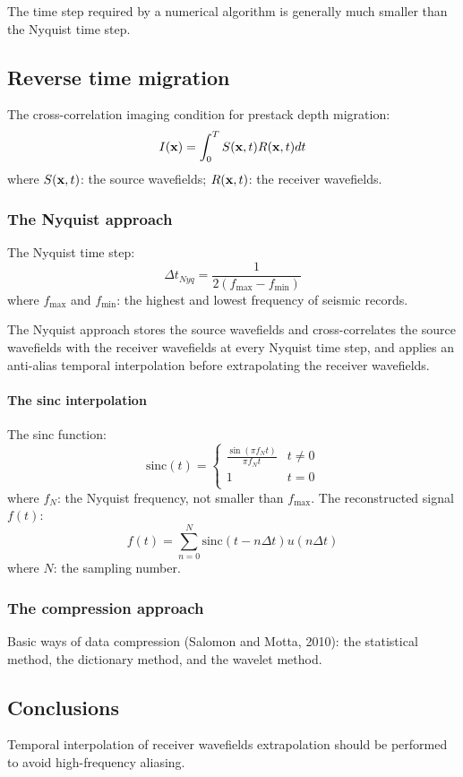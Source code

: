 The time step required by a numerical algorithm is generally much smaller
than the Nyquist time step.

\subsection{Reverse time migration}
The cross-correlation imaging condition for prestack depth migration:
\[ I(\mathbf{x}) = \int_0^T S(\mathbf{x}, t) R(\mathbf{x}, t) dt \]
where $S(\mathbf{x}, t)$: the source wavefields;
$R(\mathbf{x}, t)$: the receiver wavefields.

\subsubsection{The Nyquist approach}
The Nyquist time step:
\[ \Delta t_{Nyq} = \frac{1}{2 (f_\text{max} - f_\text{min})} \]
where $f_\text{max}$ and $f_\text{min}$: the highest and lowest frequency
of seismic records.

The Nyquist approach 
stores the source wavefields and cross-correlates the source wavefields
with the receiver wavefields at every Nyquist time step,
and applies an anti-alias temporal interpolation
before extrapolating the receiver wavefields.

\paragraph{The sinc interpolation}
The sinc function:
\[ \text{sinc}(t) = \left\{
  \begin{array}{lc}
    \frac{\sin(\pi f_N t)}{\pi f_N t} & t \neq 0 \\
    1                                & t = 0 \\
  \end{array}
\right. \]
where $f_N$: the Nyquist frequency, not smaller than $f_\text{max}$.
The reconstructed signal $f(t)$:
\[ f(t) = \sum_{n = 0}^N \text{sinc}(t - n\Delta t) u(n\Delta t) \]
where $N$: the sampling number.

\subsubsection{The compression approach}
Basic ways of data compression (Salomon and Motta, 2010):
the statistical method, the dictionary method, and the wavelet method.

\subsection{Conclusions}
Temporal interpolation of receiver wavefields extrapolation
should be performed to avoid high-frequency aliasing.

